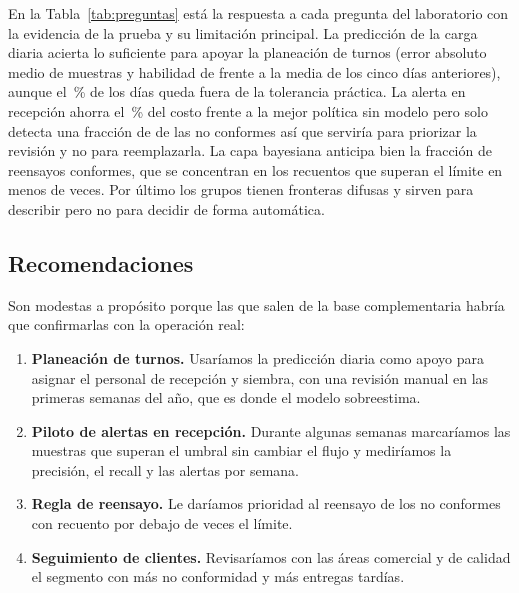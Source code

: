 En la Tabla~\ref{tab:preguntas} está la respuesta a cada pregunta del
laboratorio con la evidencia de la prueba y su limitación principal. La
predicción de la carga diaria acierta lo suficiente para apoyar la
planeación de turnos (error absoluto medio de \FinMAEPrueba{} muestras y
habilidad de \FinHabilidadPrueba{} frente a la media de los cinco días
anteriores), aunque el \FinDiasFueraPct{}\,\% de los días queda fuera de la
tolerancia práctica. La alerta en recepción ahorra el \FinAhorroPct{}\,\% del
costo frente a la mejor política sin modelo pero solo detecta una fracción de
\FinRecallPrueba{} de las no conformes así que serviría para priorizar la
revisión y no para reemplazarla. La capa bayesiana anticipa bien la fracción
de reensayos conformes, que se concentran en los recuentos que superan el
límite en menos de \ClfReglaVecesLimite{} veces. Por último los grupos tienen
fronteras difusas y sirven para describir pero no para decidir de forma
automática.

\begin{table}[!htbp]
\centering
\small
{}
\caption{Preguntas del laboratorio con la respuesta del proyecto, la
evidencia en la prueba y la limitación principal.}
\label{tab:preguntas}
\end{table}

\subsection{Recomendaciones}

Son modestas a propósito porque las que salen de la base complementaria
habría que confirmarlas con la operación real:

\begin{enumerate}[label=\alph*.]
    \item \textbf{Planeación de turnos.} Usaríamos la predicción diaria como
          apoyo para asignar el personal de recepción y siembra, con una
          revisión manual en las primeras semanas del año, que es donde el
          modelo sobreestima.
    \item \textbf{Piloto de alertas en recepción.} Durante algunas semanas
          marcaríamos las muestras que superan el umbral sin cambiar el flujo
          y mediríamos la precisión, el recall y las alertas por semana.
    \item \textbf{Regla de reensayo.} Le daríamos prioridad al reensayo de
          los no conformes con recuento por debajo de \ClfReglaVecesLimite{}
          veces el límite.
    \item \textbf{Seguimiento de clientes.} Revisaríamos con las áreas
          comercial y de calidad el segmento con más no conformidad y más
          entregas tardías.
\end{enumerate}


